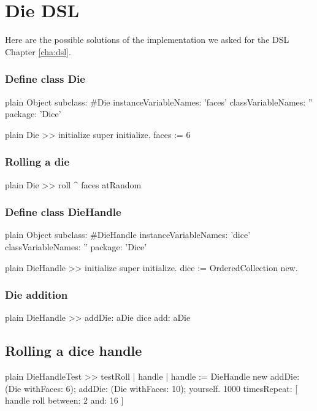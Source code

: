 \documentclass[10pt,twoside,english]{_support/latex/sbabook/sbabook}
\begin{document}
\frontmatter
\pagestyle{plain}

\tableofcontents*
\clearpage\listoffigures

\mainmatter

\chapter{Die DSL }\label{cha:dslsolution}
Here are the possible solutions of the implementation we asked for the DSL Chapter \ref{cha:dsl}. 
\subsection{Define class Die}
\begin{displaycode}{plain}
Object subclass: #Die
	instanceVariableNames: 'faces'
	classVariableNames: ''
	package: 'Dice'
\end{displaycode}

\begin{displaycode}{plain}
Die >> initialize
	super initialize.
	faces := 6
\end{displaycode}
\subsection{Rolling a die}
\begin{displaycode}{plain}
Die >> roll
    ^ faces atRandom
\end{displaycode}
\subsection{Define class DieHandle}
\begin{displaycode}{plain}
Object subclass: #DieHandle
	instanceVariableNames: 'dice'
	classVariableNames: ''
	package: 'Dice'
\end{displaycode}

\begin{displaycode}{plain}
DieHandle >> initialize
	super initialize.
	dice := OrderedCollection new.
\end{displaycode}
\subsection{Die addition}
\begin{displaycode}{plain}
DieHandle >> addDie: aDie 
	dice add: aDie
\end{displaycode}
\section{Rolling a dice handle}
\begin{displaycode}{plain}
DieHandleTest >> testRoll
	| handle |
	handle := DieHandle new
		addDie: (Die withFaces: 6);
		addDie: (Die withFaces: 10);
		yourself.
	1000 timesRepeat: [ handle roll between: 2 and: 16 ]
\end{displaycode}
\end{document}
